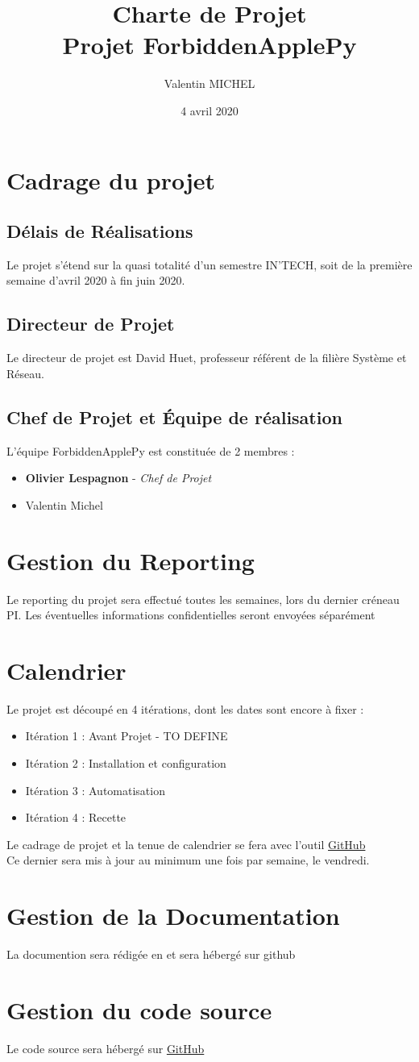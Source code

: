 \documentclass[14pt,a4paper]{extarticle}
\author{Valentin MICHEL}
\date{4 avril 2020}
\title{Charte de Projet \\ Projet ForbiddenApplePy}
\begin{document}
\maketitle{}
\justify
\break
\tableofcontents
\break
\section{Cadrage du projet}
\subsection{Délais de Réalisations}
Le projet s'étend sur la quasi totalité d'un semestre IN'TECH, soit de la première semaine d'avril 2020 à fin juin 2020.

\subsection{Directeur de Projet}
Le directeur de projet est David Huet, professeur référent de la filière Système et Réseau.

\break
\subsection{Chef de Projet et Équipe de réalisation}
L'équipe ForbiddenApplePy est constituée de 2 membres :
\begin{itemize}
    \item{\textbf{Olivier Lespagnon} - \textit{Chef de Projet}}
    \item{Valentin Michel}
\end{itemize}

\break
\section{Gestion du Reporting}
Le reporting du projet sera effectué toutes les semaines, lors du dernier créneau PI.
Les éventuelles informations confidentielles seront envoyées séparément
\section{Calendrier}
Le projet est découpé en 4 itérations, dont les dates sont encore à fixer :
\begin{itemize}
    \item{Itération 1 : Avant Projet - TO DEFINE}
    \item{Itération 2 : Installation et configuration}
    \item{Itération 3 : Automatisation}
    \item{Itération 4 : Recette}
\end{itemize}
Le cadrage de projet et la tenue de calendrier se fera avec l'outil \href{https://github.com/ForbiddenApplePy}{GitHub} \\
Ce dernier sera mis à jour au minimum une fois par semaine, le vendredi.
\section{Gestion de la Documentation}
La documention sera rédigée en \Latex et sera hébergé sur github
\section{Gestion du code source}
Le code source sera hébergé sur \href{https://github.com/ForbiddenApplePy}{GitHub}

\break
\end{document}
